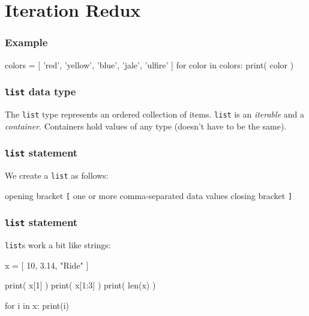 \documentclass[11pt]{beamer}
\begin{document}
\section{Iteration Redux}

\begin{frame}[fragile]
  \frametitle{Example}
  \Enlarge

  \begin{semiverbatim}
colors = [ 'red', 'yellow', 'blue', 'jale', 'ulfire' ]
for color in colors:
    print( color )
  \end{semiverbatim}
\end{frame}

\begin{frame}[fragile]
  \frametitle{\texttt{list} data type}
  \Enlarge

  \begin{itemize}
  \myitem  The \texttt{list} type represents an ordered collection of items.
  \myitem  \texttt{list} is an \emph{iterable} and a \emph{container}.
  \myitem  Containers hold values of any type (doesn't have to be the same).
  \end{itemize}
\end{frame}

\begin{frame}[fragile]
  \frametitle{\texttt{list} statement}
  \Enlarge

  \begin{itemize}
  \myitem  We create a \texttt{list} as follows:
    \begin{itemize}
    \mysubitem  opening bracket \texttt{[}
    \mysubitem  one or more comma-separated data values
    \mysubitem  closing bracket \texttt{]}
    \end{itemize}
  \end{itemize}
\end{frame}

\begin{frame}[fragile]
  \frametitle{\texttt{list} statement}
  \Enlarge

  \begin{itemize}
  \myitem  \texttt{list}s work a bit like strings:
    \begin{semiverbatim}
x = [ 10, 3.14, "Ride" ]

print( x[1] )
print( x[1:3] )
print( len(x) )

for i in x:
    print(i)
    \end{semiverbatim}
  \end{itemize}
\end{frame}
\end{document}
